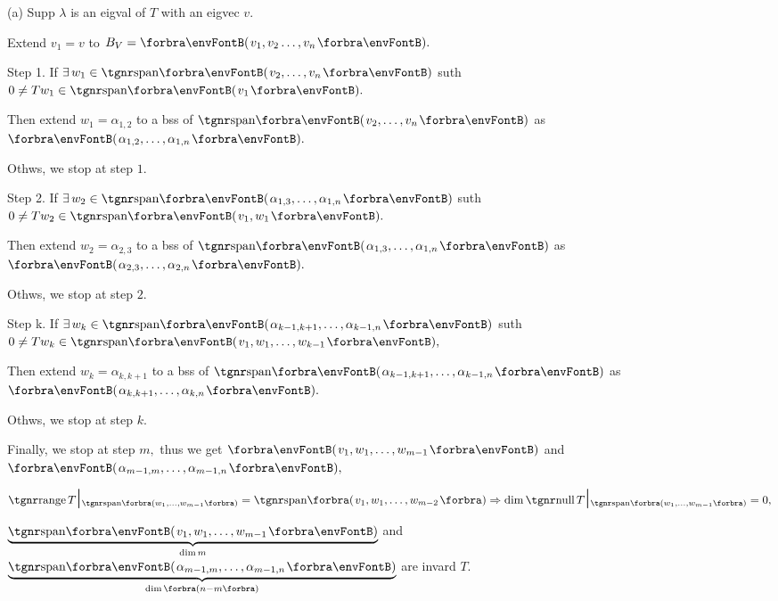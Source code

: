 \par\quad
(a) Supp $\lambda$ is an eigval of $T$ with an eigvec $v.$ \par\quad\Ha
Extend $v_1=v$ to $B_V=\Par{v_1,v_2\dots,v_n}.$\par\quad\Ha
{\tgbfx Step 1.} If $\exists\,w_1\in\Span{v_2,\dots,v_n}$ suth $0\neq Tw_1\in\Span{v_1}.$\par\quad\Ha
{} Then extend $w_1=\alpha_{1,2}$ to a bss of $\Span{v_2,\dots,v_n}$ as $\Par{\alpha_{1,2},\dots,\alpha_{1,n}}.$\par\quad\Ha
{} Othws, we stop at step $1.$\par\quad\Ha
{\tgbfx Step 2.} If $\exists\,w_2\in\Span{\alpha_{1,3},\dots,\alpha_{1,n}}$ suth $0\neq Tw_2\in\Span{v_1,w_1}.$\par\quad\Ha
{} Then extend $w_2=\alpha_{2,3}$ to a bss of $\Span{\alpha_{1,3},\dots,\alpha_{1,n}}$ as $\Par{\alpha_{2,3},\dots,\alpha_{2,n}}.$\par\quad\Ha
{} Othws, we stop at step $2.$\par\quad\Ha
{\tgbfx Step k.} If $\exists\,w_k\in\Span{\alpha_{k-1,k+1},\dots,\alpha_{k-1,n}}$ suth $0\neq Tw_k\in\Span{v_1,w_1,\dots,w_{k-1}},$\par\quad\Ha
{} Then extend $w_k=\alpha_{k,k+1}$ to a bss of $\Span{\alpha_{k-1,k+1},\dots,\alpha_{k-1,n}}$ as $\Par{\alpha_{k,k+1},\dots,\alpha_{k,n}}.$\par\quad\Ha
{} Othws, we stop at step $k.$\par\vspace{4pt}\quad\Ha
Finally, we stop at step $m,$ thus we get $\Par{v_1,w_1,\dots,w_{m-1}}$ and $\Par{\alpha_{m-1,m},\dots,\alpha_{m-1,n}},$\par\quad\Ha
$\range T\envFontLarge\mmid\envFontDefault{_{\Span[\SmallPar]{w_1,\dots,w_{m-1}}}}=\Span{v_1,w_1,\dots,w_{m-2}}\Rightarrow\dim\null T\envFontLarge\mmid\envFontDefault{_{\Span[\SmallPar]{w_1,\dots,w_{m-1}}}}=0,$\par\quad\Ha
$\underbrace{\Span{v_1,w_1,\dots,w_{m-1}}}_{\dim m}$ and $\underbrace{\Span{\alpha_{m-1,m},\dots,\alpha_{m-1,n}}}_{\dim \SmallPar{n-m}}$ are invard $T.$\par\quad\Ha
